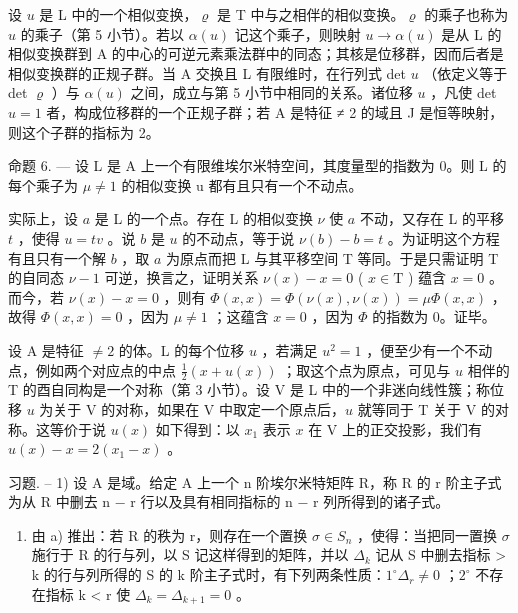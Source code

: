 设 \(u\) 是 L 中的一个相似变换，\(\varrho\) 是 T 中与之相伴的相似变换。\(\varrho\) 的乘子也称为 \(u\) 的乘子（第 5 小节）。若以 \(\alpha(u)\) 记这个乘子，则映射 \(u \to \alpha(u)\) 是从 L 的相似变换群到 A 的中心的可逆元素乘法群中的同态；其核是位移群，因而后者是相似变换群的正规子群。当 A 交换且 L 有限维时，在行列式 det \(u\) （依定义等于 det \(\varrho\) ）与 \(\alpha(u)\) 之间，成立与第 5 小节中相同的关系。诸位移 \(u\) ，凡使 det \(u = 1\) 者，构成位移群的一个正规子群；若 A 是特征 ≠ 2 的域且 J 是恒等映射，则这个子群的指标为 2。

命题 6. --- 设 L 是 A 上一个有限维埃尔米特空间，其度量型的指数为 0。则 L 的每个乘子为 \(\mu \neq 1\) 的相似变换 u 都有且只有一个不动点。

实际上，设 \(a\) 是 L 的一个点。存在 L 的相似变换 \(\nu\) 使 \(a\) 不动，又存在 L 的平移 \(t\) ，使得 \(u = tv\) 。说 \(b\) 是 \(u\) 的不动点，等于说 \(\nu(b) - b = t\) 。为证明这个方程有且只有一个解 \(b\) ，取 \(a\) 为原点而把 L 与其平移空间 T 等同。于是只需证明 T 的自同态 \(\nu - 1\) 可逆，换言之，证明关系 \(\nu(x) - x = 0\) ( \(x \in \mathrm{T}\) ) 蕴含 \(x = 0\) 。而今，若 \(\nu(x) - x = 0\) ，则有 \(\Phi(x, x) = \Phi(\nu(x), \nu(x)) = \mu \Phi(x, x)\) ，故得 \(\Phi(x, x) = 0\) ，因为 \(\mu \neq 1\) ；这蕴含 \(x = 0\) ，因为 \(\Phi\) 的指数为 0。证毕。

设 A 是特征 \(\neq 2\) 的体。L 的每个位移 \(u\) ，若满足 \(u^2 = 1\) ，便至少有一个不动点，例如两个对应点的中点 \(\frac{1}{2}(x + u(x))\) ；取这个点为原点，可见与 \(u\) 相伴的 T 的酉自同构是一个对称（第 3 小节）。设 V 是 L 中的一个非迷向线性簇；称位移 \(u\) 为关于 V 的对称，如果在 V 中取定一个原点后，\(u\) 就等同于 T 关于 V 的对称。这等价于说 \(u(x)\) 如下得到：以 \(x_1\) 表示 \(x\) 在 V 上的正交投影，我们有 \(u(x) - x = 2(x_1 - x)\) 。

习题. -- 1) 设 A 是域。给定 A 上一个 n 阶埃尔米特矩阵 R，称 R 的 r 阶主子式为从 R 中删去 n − r 行以及具有相同指标的 n − r 列所得到的诸子式。

\begin{enumerate}
\def\labelenumi{\alph{enumi})}
\setcounter{enumi}{1}
\tightlist
\item
  由 a) 推出：若 R 的秩为 r，则存在一个置换 \(\sigma \in S_{n}\) ，使得：当把同一置换 \(\sigma\) 施行于 R 的行与列，以 S 记这样得到的矩阵，并以 \(\Delta_{k}\) 记从 S 中删去指标 \textgreater{} k 的行与列所得的 S 的 k 阶主子式时，有下列两条性质：\(1^{\circ} \Delta_{r} \neq 0\) ；\(2^{\circ}\) 不存在指标 k \textless{} r 使 \(\Delta_{k} = \Delta_{k+1} = 0\) 。
\end{enumerate}

